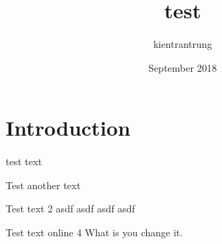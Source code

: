 \documentclass{article}
\title{test}
\author{kientrantrung }
\date{September 2018}
\begin{document}
\maketitle

\section{Introduction}
test text

Test another text

Test text 2
asdf
asdf
asdf
asdf

Test text online 4
What is you change it.
\end{document}
